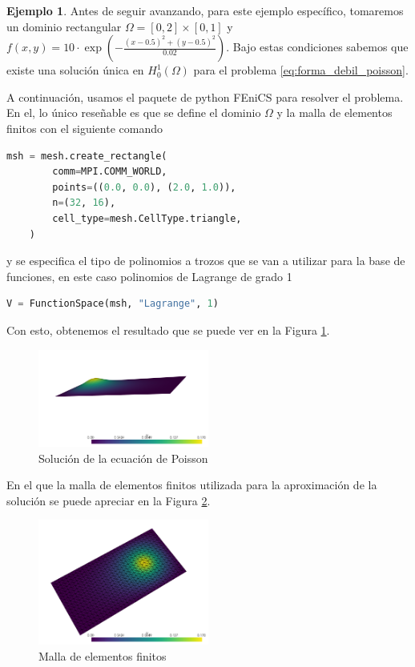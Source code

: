 \documentclass[a4paper,11pt,spanish, twoside, leqno]{tfg-uam}
\theoremstyle{definition}
\newtheorem{exmp}[teor]{Ejemplo}
\begin{document}
\begin{mdframed}
\begin{exmp}
    Antes de seguir avanzando, para este ejemplo específico, tomaremos un dominio rectangular $\Omega = [0,2] \times [0,1]$ y $f(x, y) = 10 \cdot\exp \left( - \frac{(x - 0.5)^2 + (y - 0.5)^2}{0.02} \right)$. Bajo estas condiciones sabemos que existe una solución única en $H_0^1(\Omega)$ para el problema \eqref{eq:forma_debil_poisson}.

    A continuación, usamos el paquete de python FEniCS para resolver el problema. En el, lo único reseñable es que se define el dominio $\Omega$ y la malla de elementos finitos con el siguiente comando
    \begin{lstlisting}[language=Python]
    msh = mesh.create_rectangle(
        comm=MPI.COMM_WORLD,
        points=((0.0, 0.0), (2.0, 1.0)),
        n=(32, 16),
        cell_type=mesh.CellType.triangle,
    )
    \end{lstlisting}
    y se especifica el tipo de polinomios a trozos que se van a utilizar para la base de funciones, en este caso polinomios de Lagrange de grado 1
    \begin{lstlisting}[language=Python]
        V = FunctionSpace(msh, "Lagrange", 1)
    \end{lstlisting}
    Con esto, obtenemos el resultado que se puede ver en la Figura \ref{fig:poisson}.
    \begin{figure}[H] 
        \centering
        \includegraphics[width=0.5\textwidth]{Figuras/poisson.png}
        \caption{Solución de la ecuación de Poisson}
        \label{fig:poisson}
    \end{figure}
    En el que la malla de elementos finitos utilizada para la aproximación de la solución se puede apreciar en la Figura \ref{fig:poisson_malla}.
    \begin{figure}[H]
        \centering
        \includegraphics[width=0.5\textwidth]{Figuras/malla_poisson.png}
        \caption{Malla de elementos finitos}
        \label{fig:poisson_malla}
    \end{figure}
\end{exmp}
\end{mdframed}
\end{document}

